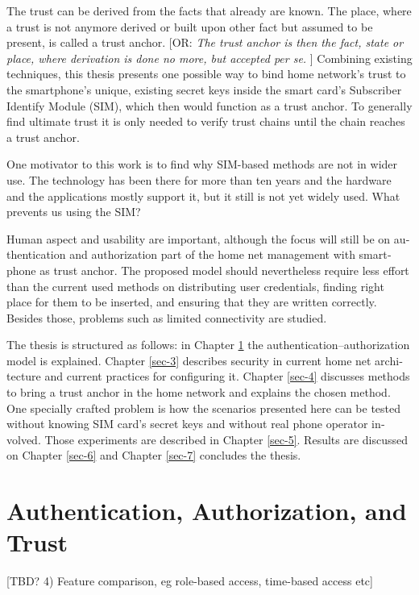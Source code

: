 \documentclass[12pt,a4paper,english]{tutthesis}
\begin{document}
\begin{otherlanguage}{english}
The trust can be derived from the facts that already are known.  The
place, where a trust is not anymore derived or built upon other fact
but assumed to be present, is called a trust anchor.  
[OR: \emph{The trust anchor is then the fact, state or place,
where derivation is done no more, but accepted per se.} ]
Combining existing techniques, this thesis presents one possible way
to bind home network's trust to the smartphone's unique, existing
secret keys inside the smart card's Subscriber Identify Module (SIM),
which then would function as a trust anchor. To generally find
ultimate trust it is only needed to verify trust chains until the
chain reaches a trust anchor.


One motivator to this work is to find why SIM-based methods are not in
wider use.  The technology has been there for more than ten years and
the hardware and the applications mostly support it, but it still is
not yet widely used. What prevents us using the SIM?



Human aspect and usability are important, although the focus will
still be on authentication and authorization part of the home net
management with smartphone as trust anchor.  The proposed model
should nevertheless require less effort than the current used methods
on distributing user credentials, finding right place for them to be
inserted, and ensuring that they are written correctly.
Besides those, problems such as limited connectivity are
studied.





The thesis is structured as follows: in Chapter \ref{sec-2} the
authentication--authorization model is explained.  Chapter \ref{sec-3} describes
security in current home net architecture and current practices for
configuring it.  Chapter \ref{sec-4} discusses methods to bring a
trust anchor in the home network and explains the chosen method.
One specially crafted problem is how the scenarios presented here can be
tested without knowing SIM card's secret keys and without real phone
operator involved.  Those experiments are described in Chapter
\ref{sec-5}.
Results are discussed on Chapter \ref{sec-6} and Chapter \ref{sec-7} concludes the
thesis.
\chapter{Authentication, Authorization, and Trust}
\label{sec-2}

[TBD? 4) Feature comparison, eg role-based access, time-based access
etc]



\end{otherlanguage}
\end{document}
